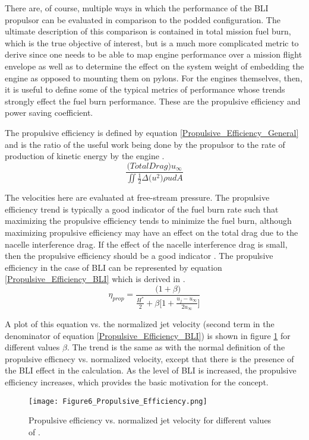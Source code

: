 There are, of course, multiple ways in which the performance of the BLI propulsor can be evaluated in comparison to the podded configuration.  The ultimate description of this comparison is contained in total mission fuel burn, which is the true objective of interest, but is a much more complicated metric to derive since one needs to be able to map engine performance over a mission flight envelope as well as to determine the effect on the system weight of embedding the engine as opposed to mounting them on pylons.  For the engines themselves, then, it is useful to define some of the typical metrics of performance whose trends strongly effect the fuel burn performance.  These are the propulsive efficiency and power saving coefficient.  

\indent The propulsive efficiency is defined by equation \ref{Propulsive_Efficiency_General} and is the ratio of the useful work being done by the propulsor to the rate of production of kinetic energy by the engine \cite{Plas2007}.
   \begin{equation}\frac{\Big(Total Drag\Big)u_\infty}
			      {\displaystyle \iint{\frac{1}{2}\Delta\Big(u^2\Big)\rho u dA}}\label{Propulsive_Efficiency_General}\end{equation}%

The velocities here are evaluated at free-stream pressure.  The propulsive efficiency trend is typically a good indicator of the fuel burn rate such that maximizing the propulsive efficiency tends to minimize the fuel burn, although maximizing propulsive efficiency may have an effect on the total drag due to the nacelle interference drag.  If the effect of the nacelle interference drag is small, then the propulsive efficiency should be a good indicator \cite{Plas2007}.  The propulsive efficiency in the case of BLI can be represented by equation \ref{Propulsive_Efficiency_BLI} which is derived in \cite{Plas2007}.  
   \begin{equation}\eta_{prop} = \frac{\Big(1+\beta\Big)}
					{\displaystyle \frac{H^*}{2} + \beta\Big[1+\frac{u_j-u_\infty}{2u_\infty}\Big]}\label{Propulsive_Efficiency_BLI}\end{equation}%

A plot of this equation vs. the normalized jet velocity (second term in the denominator of equation \ref{Propulsive_Efficiency_BLI}) is shown in figure \ref{Propulsive_Efficiency_Plot} for different values $\beta$.  The trend is the same as with the normal definition of the propulsive efficnecy vs. normalized velocity, except that there is the presence of the BLI effect in the calculation.  As the level of BLI is increased, the propulsive efficiency increases, which provides the basic motivation for the concept.
	\begin{figure}[htpb]
	\centering
	\texttt{[image: Figure6\_Propulsive\_Efficiency.png]}
	\caption{Propulsive efficiency vs. normalized jet velocity for different values of \cite{Plas2007}.}
	\label{Propulsive_Efficiency_Plot}
	\end{figure}

